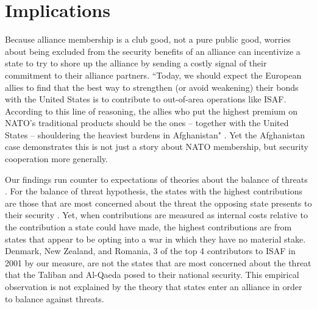 \documentclass[12pt,letterpaper]{article}
\begin{document}
\section{Implications}
	Because alliance membership is a club good, not a pure public good, worries about being excluded from the security benefits of an alliance can incentivize a state to try to shore up the alliance by sending a costly signal of their commitment to their alliance partners. ``Today, we should expect the European allies to find that the best way to strengthen (or avoid weakening) their bonds with the United States is to contribute to out-of-area operations like ISAF. According to this line of reasoning, the allies who put the highest premium on NATO’s traditional products should be the ones – together with the United States – shouldering the heaviest burdens in Afghanistan" \citep[331]{ringsmose_natoburdensharingredux_2010}. Yet the Afghanistan case demonstrates this is not just a story about NATO membership, but security cooperation more generally.

	Our findings run counter to expectations of theories about the balance of threats \citep{walt_originsalliance_1987}. For the balance of threat hypothesis, the states with the highest contributions are those that are most concerned about the threat the opposing state presents to their security \citep{haesebrouck_democraticparticipationair_2016}. Yet, when contributions are measured as internal costs relative to the contribution a state could have made, the highest contributions are from states that appear to be opting into a war in which they have no material stake. Denmark, New Zealand, and Romania, 3 of the top 4 contributors to ISAF in 2001 by our measure, are not the states that are most concerned about the threat that the Taliban and Al-Qaeda posed to their national security. This empirical observation is not explained by the theory that states enter an alliance in order to balance against threats.
\end{document}
